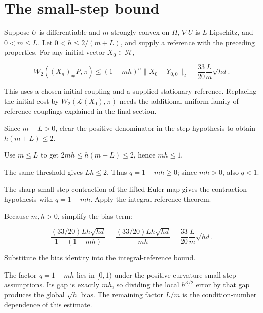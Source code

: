 \documentclass[11pt,a4paper]{article}
\begin{document}
\section{\texorpdfstring{The small-step bound}{The small-step bound}}


Suppose \(U\) is differentiable and \(m\)-strongly convex on \(H\), \(\nabla U\) is \(L\)-Lipschitz, and \(0<m\le L\). Let \(0<h\le2/(m+L)\), and supply a reference with the preceding properties. For any initial vector \(X_0\in\mathcal H\),

\[W_2((X_n)_\#P,\pi)\le(1-mh)^n\|X_0-Y_{0,0}\|_2+\frac{33}{20}\frac Lm\sqrt{hd}.\]

This uses a chosen initial coupling and a supplied stationary reference. Replacing the initial cost by \(W_2(\mathcal L(X_0),\pi)\) needs the additional uniform family of reference couplings explained in the final section.



Since \(m+L>0\), clear the positive denominator in the step hypothesis to obtain \(h(m+L)\le2\).



Use \(m\le L\) to get \(2mh\le h(m+L)\le2\), hence \(mh\le1\).



The same threshold gives \(Lh\le2\). Thus \(q=1-mh\ge0\); since \(mh>0\), also \(q<1\).



The sharp small-step contraction of the lifted Euler map gives the contraction hypothesis with \(q=1-mh\). Apply the integral-reference theorem.



Because \(m,h>0\), simplify the bias term:

\[\frac{(33/20)Lh\sqrt{hd}}{1-(1-mh)}=\frac{(33/20)Lh\sqrt{hd}}{mh}=\frac{33}{20}\frac Lm\sqrt{hd}.\]

Substitute the bias identity into the integral-reference bound.



The factor \(q=1-mh\) lies in \([0,1)\) under the positive-curvature small-step assumptions. Its gap is exactly \(mh\), so dividing the local \(h^{3/2}\) error by that gap produces the global \(\sqrt h\) bias. The remaining factor \(L/m\) is the condition-number dependence of this estimate.
\end{document}
